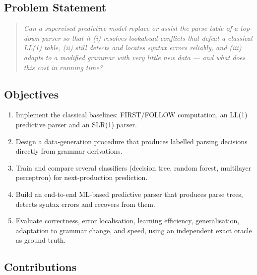 \documentclass[12pt,a4paper]{article}
\begin{document}
\subsection{Problem Statement}

\begin{quote}
\textit{Can a supervised predictive model replace or assist the parse table of
a top-down parser so that it (i) resolves lookahead conflicts that defeat a
classical LL(1) table, (ii) still detects and locates syntax errors reliably,
and (iii) adapts to a modified grammar with very little new data --- and what
does this cost in running time?}
\end{quote}

\subsection{Objectives}

\begin{enumerate}
    \item Implement the classical baselines: FIRST/FOLLOW computation, an
    LL(1) predictive parser and an SLR(1) parser.
    \item Design a data-generation procedure that produces labelled parsing
    decisions directly from grammar derivations.
    \item Train and compare several classifiers (decision tree, random forest,
    multilayer perceptron) for next-production prediction.
    \item Build an end-to-end ML-based predictive parser that produces parse
    trees, detects syntax errors and recovers from them.
    \item Evaluate correctness, error localisation, learning efficiency,
    generalisation, adaptation to grammar change, and speed, using an
    independent exact oracle as ground truth.
\end{enumerate}

\subsection{Contributions}
\end{document}
